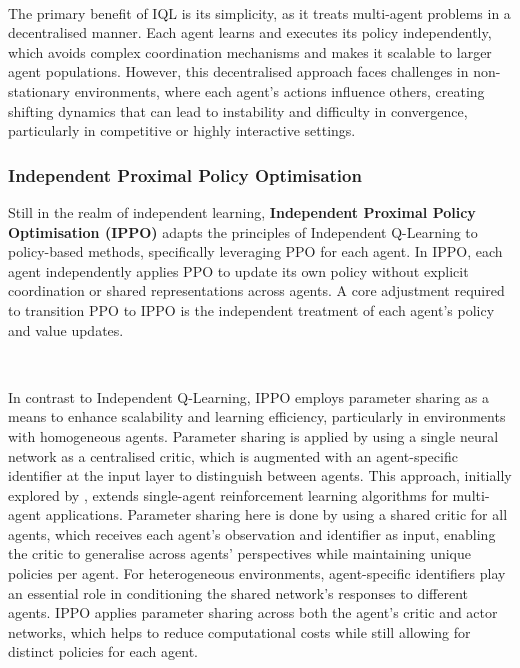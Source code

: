 \documentclass{article}
\begin{document}
\

The primary benefit of IQL is its simplicity, as it treats multi-agent problems in a decentralised manner. Each agent learns and executes its policy independently, which avoids complex coordination mechanisms and makes it scalable to larger agent populations. However, this decentralised approach faces challenges in non-stationary environments, where each agent's actions influence others, creating shifting dynamics that can lead to instability and difficulty in convergence, particularly in competitive or highly interactive settings.

\subsubsection{Independent Proximal Policy Optimisation}

Still in the realm of independent learning, \textbf{Independent Proximal Policy Optimisation (IPPO)} \citet{witt2020independent} adapts the principles of Independent Q-Learning to policy-based methods, specifically leveraging PPO for each agent. In IPPO, each agent independently applies PPO to update its own policy without explicit coordination or shared representations across agents. A core adjustment required to transition PPO to IPPO is the independent treatment of each agent’s policy and value updates.

\

In contrast to Independent Q-Learning, IPPO employs parameter sharing as a means to enhance scalability and learning efficiency, particularly in environments with homogeneous agents. Parameter sharing is applied by using a single neural network as a centralised critic, which is augmented with an agent-specific identifier at the input layer to distinguish between agents. This approach, initially explored by \citet{gupta2017cooperative}, extends single-agent reinforcement learning algorithms for multi-agent applications. Parameter sharing here is done by using a shared critic for all agents, which receives each agent’s observation and identifier as input, enabling the critic to generalise across agents’ perspectives while maintaining unique policies per agent. For heterogeneous environments, agent-specific identifiers play an essential role in conditioning the shared network’s responses to different agents. IPPO applies parameter sharing across both the agent’s critic and actor networks, which helps to reduce computational costs while still allowing for distinct policies for each agent. 
\end{document}
